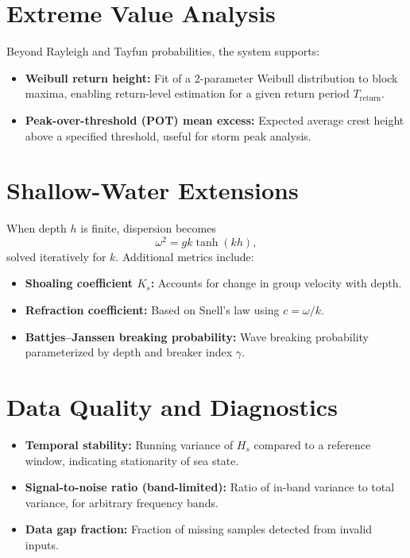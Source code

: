 \documentclass[11pt]{article}
\begin{document}
\section{Extreme Value Analysis}

Beyond Rayleigh and Tayfun probabilities, the system supports:
\begin{itemize}
  \item \textbf{Weibull return height:} Fit of a 2-parameter Weibull distribution to block maxima, enabling return-level estimation for a given return period $T_{\text{return}}$.
  \item \textbf{Peak-over-threshold (POT) mean excess:} Expected average crest height above a specified threshold, useful for storm peak analysis.
\end{itemize}

\section{Shallow-Water Extensions}

When depth $h$ is finite, dispersion becomes
\[
\omega^2 = gk \tanh(kh),
\]
solved iteratively for $k$. Additional metrics include:
\begin{itemize}
  \item \textbf{Shoaling coefficient $K_s$:} Accounts for change in group velocity with depth.
  \item \textbf{Refraction coefficient:} Based on Snell’s law using $c=\omega/k$.
  \item \textbf{Battjes–Janssen breaking probability:} Wave breaking probability parameterized by depth and breaker index $\gamma$.
\end{itemize}

\section{Data Quality and Diagnostics}

\begin{itemize}
  \item \textbf{Temporal stability:} Running variance of $H_s$ compared to a reference window, indicating stationarity of sea state.
  \item \textbf{Signal-to-noise ratio (band-limited):} Ratio of in-band variance to total variance, for arbitrary frequency bands.
  \item \textbf{Data gap fraction:} Fraction of missing samples detected from invalid inputs.
\end{itemize}
\end{document}
